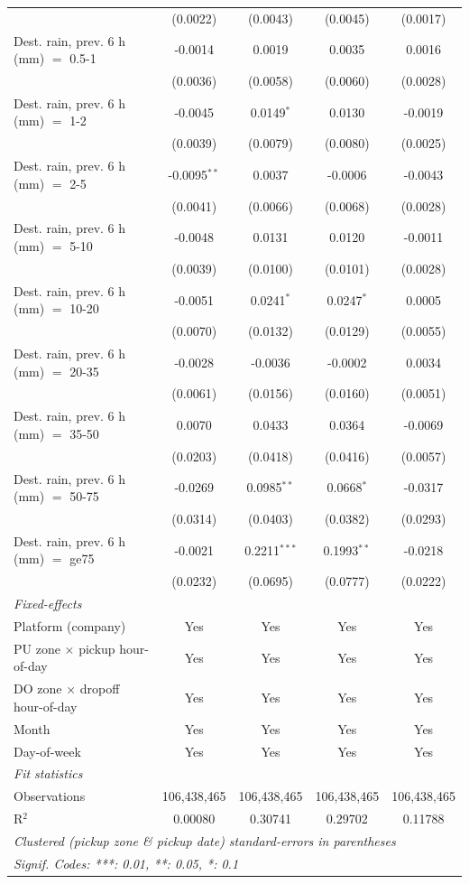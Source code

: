 \begin{tabular}{lcccc}
    & (0.0022) & (0.0043) & (0.0045) & (0.0017)\\
   Dest. rain, prev. 6 h (mm) $=$ 0.5-1 & -0.0014 & 0.0019 & 0.0035 & 0.0016\\
    & (0.0036) & (0.0058) & (0.0060) & (0.0028)\\
   Dest. rain, prev. 6 h (mm) $=$ 1-2 & -0.0045 & 0.0149$^{*}$ & 0.0130 & -0.0019\\
    & (0.0039) & (0.0079) & (0.0080) & (0.0025)\\
   Dest. rain, prev. 6 h (mm) $=$ 2-5 & -0.0095$^{**}$ & 0.0037 & -0.0006 & -0.0043\\
    & (0.0041) & (0.0066) & (0.0068) & (0.0028)\\
   Dest. rain, prev. 6 h (mm) $=$ 5-10 & -0.0048 & 0.0131 & 0.0120 & -0.0011\\
    & (0.0039) & (0.0100) & (0.0101) & (0.0028)\\
   Dest. rain, prev. 6 h (mm) $=$ 10-20 & -0.0051 & 0.0241$^{*}$ & 0.0247$^{*}$ & 0.0005\\
    & (0.0070) & (0.0132) & (0.0129) & (0.0055)\\
   Dest. rain, prev. 6 h (mm) $=$ 20-35 & -0.0028 & -0.0036 & -0.0002 & 0.0034\\
    & (0.0061) & (0.0156) & (0.0160) & (0.0051)\\
   Dest. rain, prev. 6 h (mm) $=$ 35-50 & 0.0070 & 0.0433 & 0.0364 & -0.0069\\
    & (0.0203) & (0.0418) & (0.0416) & (0.0057)\\
   Dest. rain, prev. 6 h (mm) $=$ 50-75 & -0.0269 & 0.0985$^{**}$ & 0.0668$^{*}$ & -0.0317\\
    & (0.0314) & (0.0403) & (0.0382) & (0.0293)\\
   Dest. rain, prev. 6 h (mm) $=$ ge75 & -0.0021 & 0.2211$^{***}$ & 0.1993$^{**}$ & -0.0218\\
    & (0.0232) & (0.0695) & (0.0777) & (0.0222)\\
   \midrule
   \emph{Fixed-effects}\\
   Platform (company) & Yes & Yes & Yes & Yes\\
   PU zone $\times$ pickup hour-of-day & Yes & Yes & Yes & Yes\\
   DO zone $\times$ dropoff hour-of-day & Yes & Yes & Yes & Yes\\
   Month & Yes & Yes & Yes & Yes\\
   Day-of-week & Yes & Yes & Yes & Yes\\
   \midrule
   \emph{Fit statistics}\\
   Observations & 106,438,465 & 106,438,465 & 106,438,465 & 106,438,465\\
   R$^2$ & 0.00080 & 0.30741 & 0.29702 & 0.11788\\
   \midrule \midrule
   \multicolumn{5}{l}{\emph{Clustered (pickup zone \& pickup date) standard-errors in parentheses}}\\
   \multicolumn{5}{l}{\emph{Signif. Codes: ***: 0.01, **: 0.05, *: 0.1}}\\
\end{tabular}
 
